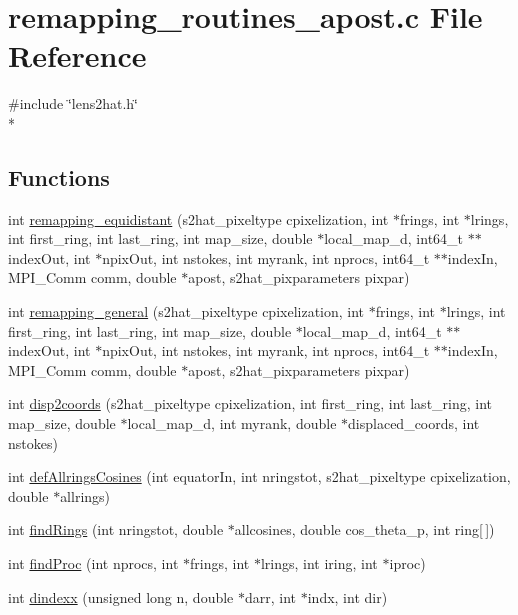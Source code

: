 \section{remapping\-\_\-routines\-\_\-apost.\-c File Reference}
\label{rng_2disptest_2remapping__routines__apost_8c}
{\ttfamily \#include \char`\"{}lens2hat.\-h\char`\"{}}\\*
\subsection*{Functions}
\begin{DoxyCompactItemize}
\item 
int \hyperlink{rng_2disptest_2remapping__routines__apost_8c_ae1248e72adcfb1adcdf786185cda9551}{remapping\-\_\-equidistant} (s2hat\-\_\-pixeltype cpixelization, int $\ast$frings, int $\ast$lrings, int first\-\_\-ring, int last\-\_\-ring, int map\-\_\-size, double $\ast$local\-\_\-map\-\_\-d, int64\-\_\-t $\ast$$\ast$index\-Out, int $\ast$npix\-Out, int nstokes, int myrank, int nprocs, int64\-\_\-t $\ast$$\ast$index\-In, M\-P\-I\-\_\-\-Comm comm, double $\ast$apost, s2hat\-\_\-pixparameters pixpar)
\item 
int \hyperlink{rng_2disptest_2remapping__routines__apost_8c_ab9f33bb3e84019d4d1f2b669b3d84d55}{remapping\-\_\-general} (s2hat\-\_\-pixeltype cpixelization, int $\ast$frings, int $\ast$lrings, int first\-\_\-ring, int last\-\_\-ring, int map\-\_\-size, double $\ast$local\-\_\-map\-\_\-d, int64\-\_\-t $\ast$$\ast$index\-Out, int $\ast$npix\-Out, int nstokes, int myrank, int nprocs, int64\-\_\-t $\ast$$\ast$index\-In, M\-P\-I\-\_\-\-Comm comm, double $\ast$apost, s2hat\-\_\-pixparameters pixpar)
\item 
int \hyperlink{rng_2disptest_2remapping__routines__apost_8c_a8224d455c626532938c1729f5e62daee}{disp2coords} (s2hat\-\_\-pixeltype cpixelization, int first\-\_\-ring, int last\-\_\-ring, int map\-\_\-size, double $\ast$local\-\_\-map\-\_\-d, int myrank, double $\ast$displaced\-\_\-coords, int nstokes)
\item 
int \hyperlink{rng_2disptest_2remapping__routines__apost_8c_af6cfda4741a11339b5a1d9c599411b87}{def\-Allrings\-Cosines} (int equator\-In, int nringstot, s2hat\-\_\-pixeltype cpixelization, double $\ast$allrings)
\item 
int \hyperlink{rng_2disptest_2remapping__routines__apost_8c_a95c082e86d6e644f4789485021f90235}{find\-Rings} (int nringstot, double $\ast$allcosines, double cos\-\_\-theta\-\_\-p, int ring\mbox{[}$\,$\mbox{]})
\item 
int \hyperlink{rng_2disptest_2remapping__routines__apost_8c_af4ba917a5b9f32394911c8d28d6c2d07}{find\-Proc} (int nprocs, int $\ast$frings, int $\ast$lrings, int iring, int $\ast$iproc)
\item 
int \hyperlink{rng_2disptest_2remapping__routines__apost_8c_ad574f0dfca1f8db2b630a9b6cf3a45c9}{dindexx} (unsigned long n, double $\ast$darr, int $\ast$indx, int dir)
\end{DoxyCompactItemize}


